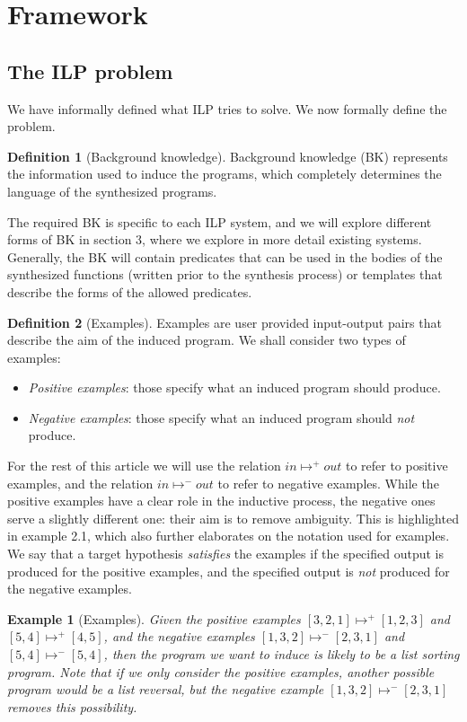 \documentclass{article}
\newtheorem{example}{Example}
\theoremstyle{definition}
\newtheorem{defn}{Definition}[section]
\begin{document}
\section{Framework}
\subsection{The ILP problem}
We have informally defined what ILP tries to solve. We now formally define the problem.

\begin{defn}[Background knowledge]
Background knowledge (BK) represents the information used to induce the programs,  which completely determines the language of the synthesized programs.
\end{defn}
The required BK is specific to each ILP system, and we will explore different forms of BK in section 3, where we explore in more detail existing systems. Generally, the BK will contain predicates that can be used in the bodies of the synthesized functions (written prior to the synthesis process) or templates that describe the forms of the allowed predicates. 

\begin{defn}[Examples]
Examples are user provided input-output pairs that describe the aim of the induced program. We shall consider two types of examples:
\begin{itemize}
\item \textit{Positive examples}: those specify what an induced program should produce.
\item \textit{Negative examples}: those specify what an induced program should \emph{not} produce.
\end{itemize}
\end{defn}
For the rest of this article we will use the relation $in \mapsto^+ out$ to refer to positive examples, and the relation $in \mapsto^- out$ to refer to negative examples. While the positive examples have a clear role in the inductive process, the negative ones serve a slightly different one: their aim is to remove ambiguity. This is highlighted in example 2.1, which also further elaborates on the notation used for examples. We say that a target hypothesis \emph{satisfies} the examples if the specified output is produced for the positive examples, and the specified output is \emph{not} produced for the negative examples.

\begin{example}[Examples]
Given the positive examples $[3,2,1] \mapsto^+ [1,2,3]$ and $[5,4] \mapsto^+ [4,5]$, and the negative examples $[1,3,2] \mapsto^- [2,3,1]$ and $[5,4] \mapsto^- [5,4]$, then the program we want to induce is likely to be a list sorting program. Note that if we only consider the positive examples, another possible program would be a list reversal, but the negative example $[1,3,2] \mapsto^- [2,3,1]$ removes this possibility.
\end{example}
\end{document}
